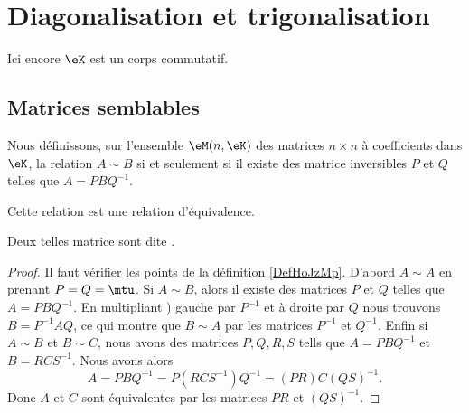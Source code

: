 

\section{Diagonalisation et trigonalisation}

Ici encore \( \eK\) est un corps commutatif.

\subsection{Matrices semblables}



\begin{propositionDef}      \label{PROPooXGXTooQNAAxw}
	Nous définissons, sur l'ensemble \( \eM(n,\eK)\) des matrices \( n\times n\) à coefficients dans \(\eK\), la relation  \( A\sim B\) si et seulement si il existe des matrice inversibles \( P\) et \( Q\) telles que \( A=PBQ^{-1}\).

	Cette relation est une relation d'équivalence.

	Deux telles matrice sont dite .
\end{propositionDef}

\begin{proof}
	Il faut vérifier les points de la définition \ref{DefHoJzMp}. D'abord \( A\sim A\) en prenant \( P=Q=\mtu\). Si \( A\sim B\), alors il existe des matrices \( P\) et \( Q\) telles que \( A=PBQ^{-1}\). En multipliant ) gauche par \( P^{-1}\) et à droite par \( Q\) nous trouvons \( B=P^{-1}AQ\), ce qui montre que \( B\sim A\) par les matrices \( P^{-1}\) et \( Q^{-1}\). Enfin si \( A\sim B\) et \( B\sim C\), nous avons des matrices \( P,Q,R,S\) tells que \( A=PBQ^{-1}\) et \( B=RCS^{-1}\). Nous avons alors
	\begin{equation}
		A=PBQ^{-1}=P(RCS^{-1})Q^{-1}=(PR)C(QS)^{-1}.
	\end{equation}
	Donc \( A\) et \( C\) sont équivalentes par les matrices \( PR\) et \(  (QS)^{-1} \).
\end{proof}


